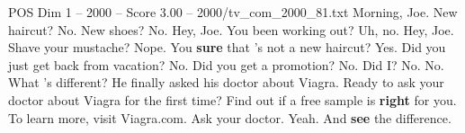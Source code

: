 \begin{textsample}{POS Dim 1 – 2000 – Score 3.00 – 2000/tv\_com\_2000\_81.txt}  \label{ex:f1_pos_077}
Morning, Joe.
New haircut?
No.
New shoes?
No.
Hey, Joe.
You been working out?
Uh, no.
Hey, Joe.
Shave your mustache?
Nope.
You \textbf{sure} that 's not a new haircut?
Yes.
Did you just get back from vacation?
No.
Did you get a promotion?
No.
Did I?
No.
No.
What 's different?
He finally asked his doctor about Viagra.
Ready to ask your doctor about Viagra for the first time?
Find out if a free sample is \textbf{right} for you.
To learn more, visit Viagra.com.
Ask your doctor.
Yeah.
And \textbf{see} the difference.

\end{textsample}
